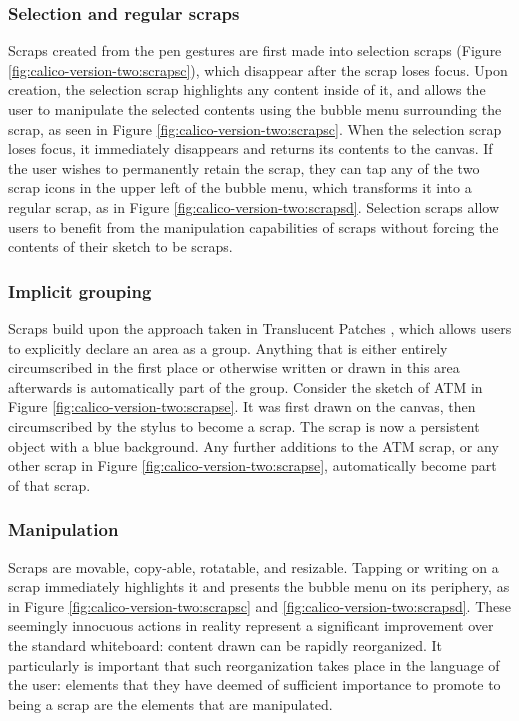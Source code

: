 \subsubsection{Selection and regular scraps} Scraps created from the pen gestures are first made into selection scraps (Figure \ref{fig:calico-version-two:scrapsc}), which disappear after the scrap loses focus. Upon creation, the selection scrap highlights any content inside of it, and allows the user to manipulate the selected contents using the bubble menu surrounding the scrap, as seen in Figure \ref{fig:calico-version-two:scrapsc}. When the selection scrap loses focus, it immediately disappears and returns its contents to the canvas. If the user wishes to permanently retain the scrap, they can tap any of the two scrap icons in the upper left of the bubble menu, which transforms it into a regular scrap, as in Figure \ref{fig:calico-version-two:scrapsd}. Selection scraps allow users to benefit from the manipulation capabilities of scraps without forcing the contents of their sketch to be scraps.

\subsubsection{Implicit grouping} Scraps build upon the approach taken in Translucent Patches \cite{Kramer}, which allows users to explicitly declare an area as a group. Anything that is either entirely circumscribed in the first place or otherwise written or drawn in this area afterwards is automatically part of the group. Consider the sketch of ATM in Figure \ref{fig:calico-version-two:scrapse}. It was first drawn on the canvas, then circumscribed by the stylus to become a scrap. The scrap is now a persistent object with a blue background. Any further additions to the ATM scrap, or any other scrap in Figure \ref{fig:calico-version-two:scrapse}, automatically become part of that scrap.

\subsubsection{Manipulation} Scraps are movable, copy-able, rotatable, and resizable. Tapping or writing on a scrap immediately highlights it and presents the bubble menu on its periphery, as in Figure \ref{fig:calico-version-two:scrapsc} and \ref{fig:calico-version-two:scrapsd}. These seemingly innocuous actions in reality represent a significant improvement over the standard whiteboard: content drawn can be rapidly reorganized. It particularly is important that such reorganization takes place in the language of the user: elements that they have deemed of sufficient importance to promote to being a scrap are the elements that are manipulated.

